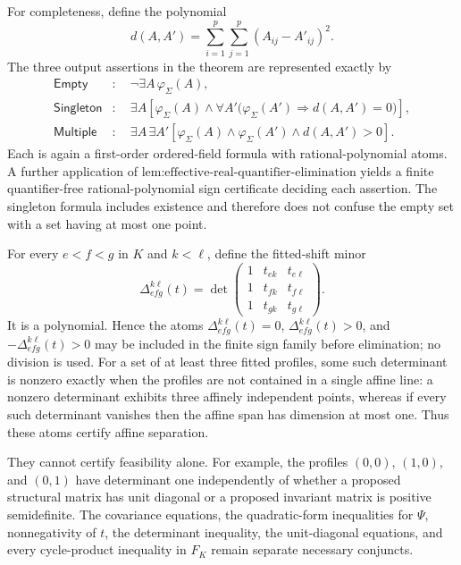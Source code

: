 For completeness, define the polynomial
\[
 d(A,A')=\sum_{i=1}^p\sum_{j=1}^p(A_{ij}-A'_{ij})^2.
\]
The three output assertions in the theorem are represented exactly by
\[
\begin{aligned}
 \mathsf{Empty}&:\quad \neg\exists A\,\varphi_\Sigma(A),\\
 \mathsf{Singleton}&:\quad
   \exists A\left[\varphi_\Sigma(A)\wedge
   \forall A'\bigl(\varphi_\Sigma(A')\Rightarrow d(A,A')=0\bigr)\right],\\
 \mathsf{Multiple}&:\quad
   \exists A\,\exists A'\left[
   \varphi_\Sigma(A)\wedge\varphi_\Sigma(A')\wedge d(A,A')>0\right].
\end{aligned}
\]
Each is again a first-order ordered-field formula with rational-polynomial atoms.  A further application of \(\text{lem:effective-real-quantifier-elimination}\) yields a finite quantifier-free rational-polynomial sign certificate deciding each assertion.  The singleton formula includes existence and therefore does not confuse the empty set with a set having at most one point.

For every \(e<f<g\) in \(K\) and \(k<\ell\), define the fitted-shift minor
\[
 \Delta_{efg}^{k\ell}(t)=
 \det\begin{pmatrix}
 1&t_{ek}&t_{e\ell}\\
 1&t_{fk}&t_{f\ell}\\
 1&t_{gk}&t_{g\ell}
 \end{pmatrix}.
\]
It is a polynomial.  Hence the atoms \(\Delta_{efg}^{k\ell}(t)=0\), \(\Delta_{efg}^{k\ell}(t)>0\), and \(-\Delta_{efg}^{k\ell}(t)>0\) may be included in the finite sign family before elimination; no division is used.  For a set of at least three fitted profiles, some such determinant is nonzero exactly when the profiles are not contained in a single affine line: a nonzero determinant exhibits three affinely independent points, whereas if every such determinant vanishes then the affine span has dimension at most one.  Thus these atoms certify affine separation.

They cannot certify feasibility alone.  For example, the profiles \((0,0)\), \((1,0)\), and \((0,1)\) have determinant one independently of whether a proposed structural matrix has unit diagonal or a proposed invariant matrix is positive semidefinite.  The covariance equations, the quadratic-form inequalities for \(\Psi\), nonnegativity of \(t\), the determinant inequality, the unit-diagonal equations, and every cycle-product inequality in \(F_K\) remain separate necessary conjuncts.

